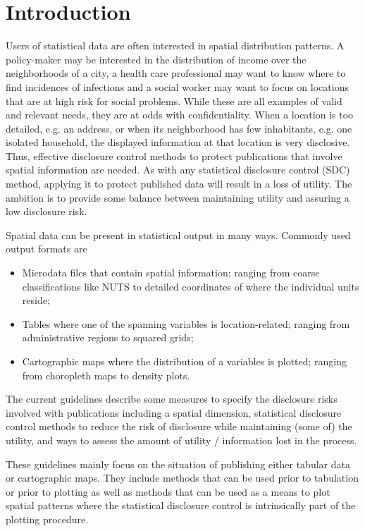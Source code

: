 \chapter{Introduction} \label{sec:intro}
Users of statistical data are often interested in spatial distribution patterns. A policy-maker may be interested in the distribution of income over the neighborhoods of a city, a health care professional may want to know where to find incidences of infections and a social worker may want to focus on locations that are at high risk for social problems. While these are all examples of valid and relevant needs, they are at odds with confidentiality. When a location is too detailed, e.g. an address, or when its neighborhood has few inhabitants, e.g. one isolated household, the displayed information at that location is very disclosive. Thus, effective disclosure control methods to protect publications that involve spatial information are needed. As with any statistical disclosure control (SDC) method, applying it to protect published data will result in a loss of utility. The ambition is to provide some balance between maintaining utility and assuring a low disclosure risk. 

Spatial data can be present in statistical output in many ways. Commonly used output formats are
\begin{itemize}
    \item Microdata files that contain spatial information; ranging from coarse classifications like NUTS to detailed coordinates of where the individual units reside;
    \item Tables where one of the spanning variables is location-related; ranging from administrative regions to squared grids;
    \item Cartographic maps where the distribution of a variables is plotted; ranging from choropleth maps to density plots.
\end{itemize}

The current guidelines describe some measures to specify the disclosure risks involved with publications including a spatial dimension, statistical disclosure control methods to reduce the risk of disclosure while maintaining (some of) the utility, and ways to assess the amount of utility / information lost in the process.

These guidelines mainly focus on the situation of publishing either tabular data or cartographic maps. They include methods that can be used prior to tabulation or prior to plotting as well as methods that can be used as a means to plot spatial patterns where the statistical disclosure control is intrinsically part of the plotting procedure.\bigskip

